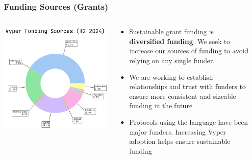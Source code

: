 \documentclass[aspectratio=169]{beamer}
\begin{document}
	\begin{frame}
		\frametitle{Funding Sources (Grants)}
		\begin{columns}[T,totalwidth=\textwidth]
			\begin{column}{0.4\textwidth}
				\includegraphics[width=\columnwidth]{charts/revenue.png}
			\end{column}
			\begin{column}{0.55\textwidth}
				\begin{itemize}
					\item Sustainable grant funding is \textbf{diversified funding}. We seek to increase our sources of funding to avoid relying on any single funder.
					\vspace{0.5em}
					\item We are working to establish relationships and trust with funders to ensure more consistent and sizeable funding in the future
					\vspace{0.5em}
					\item Protocols using the language have been major funders. Increasing Vyper adoption helps ensure sustainable funding
				\end{itemize}
			\end{column}
		\end{columns}
	\end{frame}
	
\end{document}
